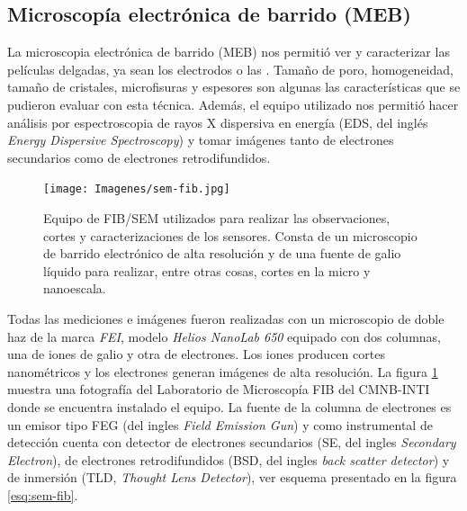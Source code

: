 	\subsection{Microscopía electrónica de barrido (MEB)}\label{sec:SEM}

		La microscopia electrónica de barrido (MEB) nos permitió ver y caracterizar las películas delgadas, ya sean los electrodos o las \pdm. Tamaño de poro, homogeneidad, tamaño de cristales, microfisuras y espesores son algunas las características que se pudieron evaluar con esta técnica. Además, el equipo utilizado nos permitió hacer análisis por espectroscopia de rayos X dispersiva en energía (EDS, del inglés \textit{Energy Dispersive Spectroscopy}) y tomar imágenes tanto de electrones secundarios como de electrones retrodifundidos. \cite{Goodhew2000,Watt1997}


			\begin{figure}[t!]
			 		  \begin{center}
			 		  \texttt{[image: Imagenes/sem-fib.jpg]}
			 		  \caption[Microscopio de doble haz FIB/SEM]{Equipo de FIB/SEM utilizados para realizar las observaciones, cortes y caracterizaciones de los sensores. Consta de un microscopio de barrido electrónico de alta resolución y de una fuente de galio líquido para realizar, entre otras cosas, cortes en la micro y nanoescala.}
			 		  \label{fig:sem-fib}
			 		  \end{center}
			 		  \end{figure}


		Todas las mediciones e imágenes fueron realizadas con un microscopio de doble haz de la marca \textit{FEI}, modelo \textit{Helios NanoLab 650} equipado con dos columnas, una de iones de galio y otra de electrones. Los iones producen cortes nanométricos y los electrones generan imágenes de alta resolución. La figura \ref{fig:sem-fib} muestra una fotografía del Laboratorio de Microscopía FIB del CMNB-INTI donde se encuentra instalado el equipo. La fuente de la columna de electrones es un emisor tipo FEG (del ingles \textit{Field Emission Gun}) y como instrumental de detección cuenta con detector de electrones secundarios (SE, del ingles \textit{Secondary Electron}), de electrones retrodifundidos (BSD, del ingles \textit{back scatter detector}) y de inmersión (TLD, \textit{Thought Lens Detector}), ver esquema presentado en la figura \ref{esq:sem-fib}. 


